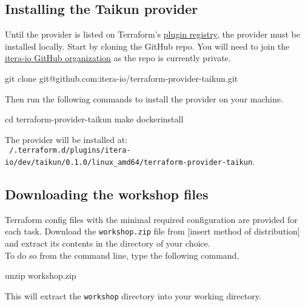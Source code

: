 \subsection{Installing the Taikun provider}
Until the provider is listed on Terraform's \href{https://registry.terraform.io/browse/providers}{plugin registry}, the provider must be installed locally.
Start by cloning the GitHub repo.
You will need to join the \href{https://github.com/itera-io/}{itera-io GitHub organization}
as the repo is currently private.
\begin{shell}
git clone git@github.com:itera-io/terraform-provider-taikun.git
\end{shell}
Then run the following commands to install the provider on your machine.
\begin{shell}
cd terraform-provider-taikun
make dockerinstall
\end{shell}
The provider will be installed at:\\
\texttt{~/.terraform.d/plugins/itera-io/dev/taikun/0.1.0/linux\_amd64/terraform-provider-taikun}.

\subsection{Downloading the workshop files}
Terraform config files with the minimal required configuration are provided for each task.
Download the \texttt{workshop.zip} file from [insert method of distribution] %
and extract its contents in the directory of your choice.\\

To do so from the command line, type the following command.
\begin{shell}
unzip workshop.zip
\end{shell}
This will extract the \texttt{workshop} directory into your working directory.
